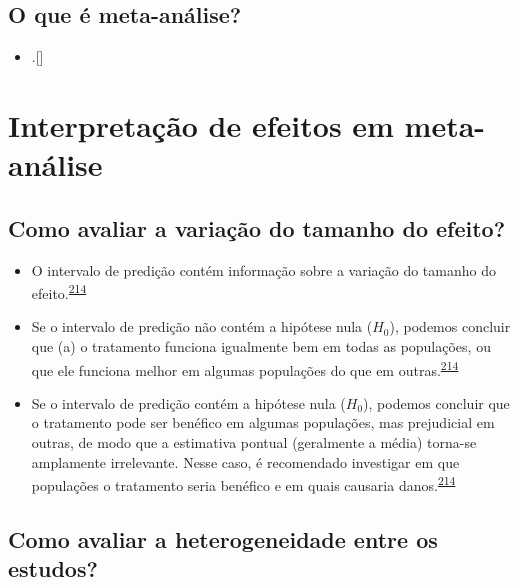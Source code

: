 \documentclass[
  a4paper,
]{book}
\providecommand{\tightlist}{%
  \setlength{\itemsep}{0pt}\setlength{\parskip}{0pt}}
\begin{document}
\hypertarget{o-que-uxe9-meta-anuxe1lise}{%
\subsection{O que é meta-análise?}\label{o-que-uxe9-meta-anuxe1lise}}

\begin{itemize}
\tightlist
\item
  .{[}{]}
\end{itemize}

\hypertarget{interpretacao}{%
\section{Interpretação de efeitos em meta-análise}\label{interpretacao}}

\hypertarget{como-avaliar-a-variauxe7uxe3o-do-tamanho-do-efeito}{%
\subsection{Como avaliar a variação do tamanho do efeito?}\label{como-avaliar-a-variauxe7uxe3o-do-tamanho-do-efeito}}

\begin{itemize}
\item
  O intervalo de predição contém informação sobre a variação do tamanho do efeito.\textsuperscript{\protect\hyperlink{ref-Borenstein2022}{214}}
\item
  Se o intervalo de predição não contém a hipótese nula (\(H_{0}\)), podemos concluir que (a) o tratamento funciona igualmente bem em todas as populações, ou que ele funciona melhor em algumas populações do que em outras.\textsuperscript{\protect\hyperlink{ref-Borenstein2022}{214}}
\item
  Se o intervalo de predição contém a hipótese nula (\(H_{0}\)), podemos concluir que o tratamento pode ser benéfico em algumas populações, mas prejudicial em outras, de modo que a estimativa pontual (geralmente a média) torna-se amplamente irrelevante. Nesse caso, é recomendado investigar em que populações o tratamento seria benéfico e em quais causaria danos.\textsuperscript{\protect\hyperlink{ref-Borenstein2022}{214}}
\end{itemize}

\hypertarget{como-avaliar-a-heterogeneidade-entre-os-estudos}{%
\subsection{Como avaliar a heterogeneidade entre os estudos?}\label{como-avaliar-a-heterogeneidade-entre-os-estudos}}
\end{document}
